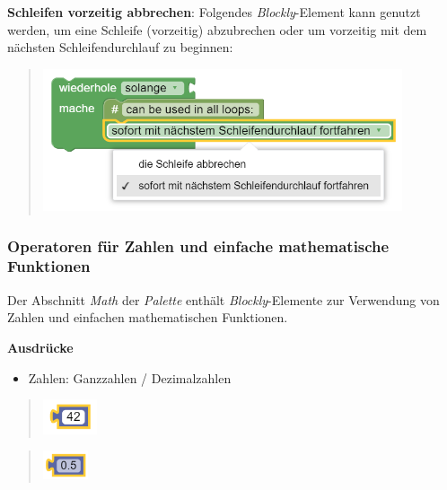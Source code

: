 \documentclass[
  letterpaper,
  DIV=11]{scrreprt}
\providecommand{\tightlist}{%
  \setlength{\itemsep}{0pt}\setlength{\parskip}{0pt}}\usepackage{longtable,booktabs,array}
\begin{document}
\begin{tcolorbox}
\textbf{Schleifen vorzeitig abbrechen}: Folgendes \emph{Blockly}-Element
kann genutzt werden, um eine Schleife (vorzeitig) abzubrechen oder um
vorzeitig mit dem nächsten Schleifendurchlauf zu beginnen:

\begin{quote}
\includegraphics[width=4.16667in,height=\textheight]{img/screenshot-blockly-loop-break-01-DEU.png}
\end{quote}

\hypertarget{operatoren-fuxfcr-zahlen-und-einfache-mathematische-funktionen-1}{%
\subsubsection{Operatoren für Zahlen und einfache mathematische
Funktionen}\label{operatoren-fuxfcr-zahlen-und-einfache-mathematische-funktionen-1}}

Der Abschnitt \emph{Math} der \emph{Palette} enthält
\emph{Blockly}-Elemente zur Verwendung von Zahlen und einfachen
mathematischen Funktionen.

\textbf{Ausdrücke}

\begin{itemize}
\tightlist
\item
  Zahlen: Ganzzahlen / Dezimalzahlen
\end{itemize}

\begin{quote}
\includegraphics[width=0.625in,height=\textheight]{img/screenshot-routing-block-numeric-value-example42.png}
\end{quote}

\begin{quote}
\includegraphics[width=0.52083in,height=\textheight]{img/screenshot-routing-block-numeric-value-example-0point5.png}
\end{quote}


\end{tcolorbox}
\end{document}
